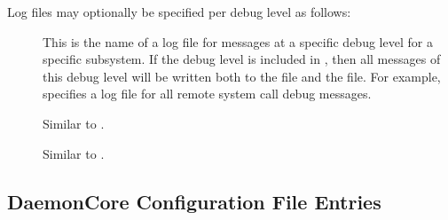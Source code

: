 Log files may optionally be specified per debug level as follows:
\begin{description}

\item[] \label{param:SubsysLevelLog}
  This is
  the name of a log file for messages at a specific debug level for a
  specific subsystem.  If the debug level is included in
  , then all messages of this debug level will be
  written both to the  file and the
   file.  For example,
   specifies a log file for all remote
  system call debug messages.

\item[] \label{param:MaxSubsysLevelLog}
  Similar to .

\item[]
  \label{param:TruncSubsysLevelLogOnOpen} Similar to
  .

\end{description}

\subsection{\label{sec:DaemonCore-Config-File-Entries}DaemonCore Configuration File Entries} 


